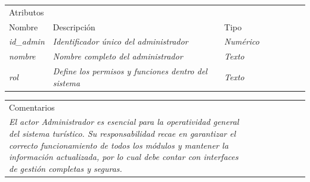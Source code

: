 \begin{table}[H]
    \begin{tabular}{llllllll}
    \cline{1-3}
    \multicolumn{3}{|l|}{\cellcolor[HTML]{F2F2F2}Atributos}                                                                                                                                                                                                    &  &  &  &  &  \\ \cline{1-3}
    \multicolumn{1}{|l|}{Nombre}                                              & \multicolumn{1}{l|}{Descripción}                                                                               & \multicolumn{1}{l|}{Tipo}                                     &  &  &  &  &  \\ \cline{1-3}
    \multicolumn{1}{|l|}{{\color[HTML]{B7B7B7} \textit{id\_admin}}}           & \multicolumn{1}{l|}{{\color[HTML]{B7B7B7} \textit{Identificador único del administrador}}}                     & \multicolumn{1}{l|}{{\color[HTML]{B7B7B7} \textit{Numérico}}} &  &  &  &  &  \\ \cline{1-3}
    \multicolumn{1}{|l|}{{\color[HTML]{B7B7B7} \textit{nombre}}}              & \multicolumn{1}{l|}{{\color[HTML]{B7B7B7} \textit{Nombre completo del administrador}}}                         & \multicolumn{1}{l|}{{\color[HTML]{B7B7B7} \textit{Texto}}}    &  &  &  &  &  \\ \cline{1-3}
    \multicolumn{1}{|l|}{{\color[HTML]{B7B7B7} \textit{rol}}}                 & \multicolumn{1}{l|}{{\color[HTML]{B7B7B7} \textit{Define los permisos y funciones dentro del sistema}}}       & \multicolumn{1}{l|}{{\color[HTML]{B7B7B7} \textit{Texto}}}    &  &  &  &  &  \\ \cline{1-3}
    \end{tabular}
\end{table}

\begin{table}[H]
    \begin{tabular}{llllllll}
    \cline{1-1}
    \multicolumn{1}{|l|}{\cellcolor[HTML]{F2F2F2}Comentarios}                                                                                                                                                                                                                                                                      &  &  &  &  &  &  &  \\ \cline{1-1}
    \multicolumn{1}{|p{15cm}|}{{\color[HTML]{CCCCCC} \textit{El actor Administrador es esencial para la operatividad general del sistema turístico. Su responsabilidad recae en garantizar el correcto funcionamiento de todos los módulos y mantener la información actualizada, por lo cual debe contar con interfaces de gestión completas y seguras.}}} &  &  &  &  &  &  &  \\ \cline{1-1}
    \end{tabular}
\end{table}

